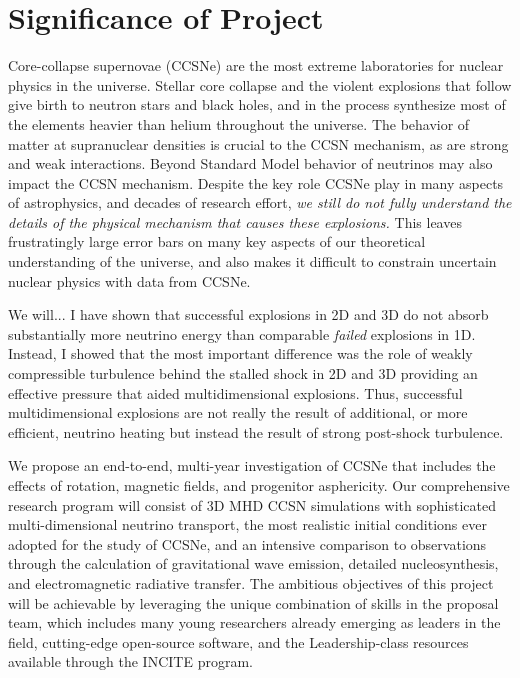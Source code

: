 \section{Significance of Project}

Core-collapse supernovae (CCSNe) are the most extreme laboratories for nuclear physics in the universe.
Stellar core collapse and the violent explosions that follow give birth to neutron stars and black holes, and in the process synthesize most of the elements heavier than helium throughout the universe.
The behavior of matter at supranuclear densities is crucial to the CCSN mechanism, as are strong and weak interactions.
Beyond Standard Model behavior of neutrinos may also impact the CCSN mechanism.
Despite the key role CCSNe play in many aspects of astrophysics, and decades of research effort, {\it we still do not fully understand the details of the physical mechanism that causes these explosions.}
This leaves frustratingly large error bars on many key aspects of our theoretical understanding of the universe, and also makes it difficult to constrain uncertain nuclear physics with data from CCSNe.


We will...
I have shown \citep{Couch:2015} that successful explosions in 2D and 3D do not absorb substantially more neutrino energy than comparable {\it failed} explosions in 1D.
Instead, I showed that the most important difference was the role of weakly compressible turbulence behind the stalled shock in 2D and 3D providing an effective pressure that aided multidimensional explosions.
Thus, successful multidimensional explosions are not really the result of additional, or more efficient, neutrino heating but instead the result of strong post-shock turbulence.


We propose an end-to-end, multi-year investigation of CCSNe that includes the effects of rotation, magnetic fields, and progenitor asphericity.
Our comprehensive research program will consist of 3D MHD CCSN simulations with sophisticated multi-dimensional neutrino transport, the most realistic initial conditions ever adopted for the study of CCSNe, and an intensive comparison to observations through the calculation of gravitational wave emission, detailed nucleosynthesis, and electromagnetic radiative transfer.
The ambitious objectives of this project will be achievable by leveraging the unique combination of skills in the proposal team, which includes many young researchers already emerging as leaders in the field, cutting-edge open-source software, and the Leadership-class resources available through the INCITE program.

